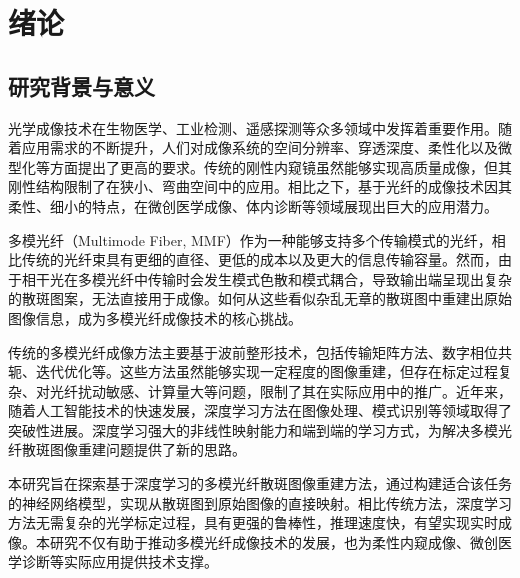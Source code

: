 
\chapter{绪论}\label{chap:introduction}

{

\section{研究背景与意义}\label{sec:background}

光学成像技术在生物医学、工业检测、遥感探测等众多领域中发挥着重要作用。随着应用需求的不断提升，人们对成像系统的空间分辨率、穿透深度、柔性化以及微型化等方面提出了更高的要求。传统的刚性内窥镜\citep{kaur2020endoscopic}虽然能够实现高质量成像，但其刚性结构限制了在狭小、弯曲空间中的应用。相比之下，基于光纤的成像技术因其柔性、细小的特点，在微创医学成像、体内诊断等领域展现出巨大的应用潜力\citep{ohayon2018minimally,vasquez2018subcellular,stiburek2023110,wen2023single}。

多模光纤（Multimode Fiber, MMF）作为一种能够支持多个传输模式的光纤，相比传统的光纤束具有更细的直径、更低的成本以及更大的信息传输容量\citep{cizmar2012exploiting,papadopoulos2013high}。然而，由于相干光在多模光纤中传输时会发生模式色散和模式耦合，导致输出端呈现出复杂的散斑图案，无法直接用于成像。如何从这些看似杂乱无章的散斑图中重建出原始图像信息，成为多模光纤成像技术的核心挑战。

传统的多模光纤成像方法主要基于波前整形技术\citep{vellekoop2007focusing}，包括传输矩阵方法\citep{cizmar2011shaping,ploschner2015seeing}、数字相位共轭\citep{papadopoulos2012focusing,czarske2016transmission}、迭代优化\citep{wang2025real,zhong2023efficient}等。这些方法虽然能够实现一定程度的图像重建，但存在标定过程复杂、对光纤扰动敏感、计算量大等问题，限制了其在实际应用中的推广。近年来，随着人工智能技术的快速发展，深度学习方法在图像处理、模式识别等领域取得了突破性进展\citep{lecun2015deep,krizhevsky2012imagenet}。深度学习强大的非线性映射能力和端到端的学习方式，为解决多模光纤散斑图像重建问题提供了新的思路\citep{borhani2018learning,rahmani2018multimode,caramazza2019transmission}。

本研究旨在探索基于深度学习的多模光纤散斑图像重建方法，通过构建适合该任务的神经网络模型，实现从散斑图到原始图像的直接映射。相比传统方法，深度学习方法无需复杂的光学标定过程，具有更强的鲁棒性，推理速度快，有望实现实时成像。本研究不仅有助于推动多模光纤成像技术的发展，也为柔性内窥成像、微创医学诊断等实际应用提供技术支撑。


}
